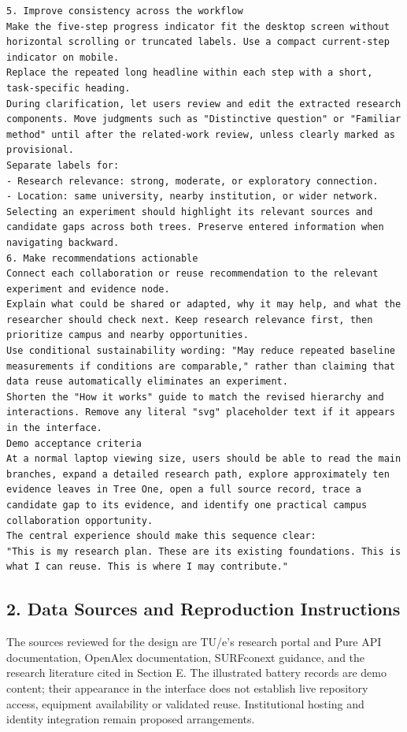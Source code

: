 \documentclass[11pt,a4paper]{article}
\begin{document}
\begin{itemize}[leftmargin=*]
\begin{lstlisting}
5. Improve consistency across the workflow
Make the five-step progress indicator fit the desktop screen without horizontal scrolling or truncated labels. Use a compact current-step indicator on mobile.
Replace the repeated long headline within each step with a short, task-specific heading.
During clarification, let users review and edit the extracted research components. Move judgments such as "Distinctive question" or "Familiar method" until after the related-work review, unless clearly marked as provisional.
Separate labels for:
- Research relevance: strong, moderate, or exploratory connection.
- Location: same university, nearby institution, or wider network.
Selecting an experiment should highlight its relevant sources and candidate gaps across both trees. Preserve entered information when navigating backward.
6. Make recommendations actionable
Connect each collaboration or reuse recommendation to the relevant experiment and evidence node.
Explain what could be shared or adapted, why it may help, and what the researcher should check next. Keep research relevance first, then prioritize campus and nearby opportunities.
Use conditional sustainability wording: "May reduce repeated baseline measurements if conditions are comparable," rather than claiming that data reuse automatically eliminates an experiment.
Shorten the "How it works" guide to match the revised hierarchy and interactions. Remove any literal "svg" placeholder text if it appears in the interface.
Demo acceptance criteria
At a normal laptop viewing size, users should be able to read the main branches, expand a detailed research path, explore approximately ten evidence leaves in Tree One, open a full source record, trace a candidate gap to its evidence, and identify one practical campus collaboration opportunity.
The central experience should make this sequence clear:
"This is my research plan. These are its existing foundations. This is what I can reuse. This is where I may contribute."
\end{lstlisting}
\end{itemize}

\subsection*{2. Data Sources and Reproduction Instructions}

\noindent The sources reviewed for the design are TU/e's research portal and Pure API documentation, OpenAlex documentation, SURFconext guidance, and the research literature cited in Section E. The illustrated battery records are demo content; their appearance in the interface does not establish live repository access, equipment availability or validated reuse. Institutional hosting and identity integration remain proposed arrangements.
\end{document}
